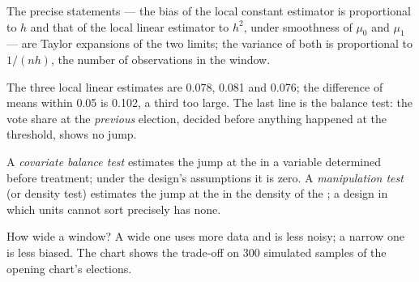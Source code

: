 \admitted
The precise statements --- the bias of the local constant estimator is
proportional to $h$ and that of the local linear estimator to $h^2$, under
smoothness of $\mu_0$ and $\mu_1$ --- are Taylor expansions of the two limits;
the variance of both is proportional to $1/(nh)$, the number of observations
in the window.

\label{lst:b3:regression-discontinuity:sharp}

\label{out:b3:regression-discontinuity:sharp}

The three local linear estimates are 0.078, 0.081 and 0.076; the difference of
means within 0.05 is 0.102, a third too large. %
The last line is the balance test: the vote share at the \emph{previous}
election, decided before anything happened at the threshold, shows no jump.

\begin{definition}\label{def:b3:regression-discontinuity:tests}
A \emph{covariate balance test} estimates the jump at the  in a variable
determined before treatment; under the design's assumptions it is zero. A
\emph{manipulation test} (or density test) estimates the jump at the  in
the density of the ; a design in which units cannot sort
precisely has none.
\end{definition}

How wide a window? A wide one uses more data and is less noisy; a narrow one is
less biased. The chart shows the trade-off on 300 simulated samples of the
opening chart's elections.

